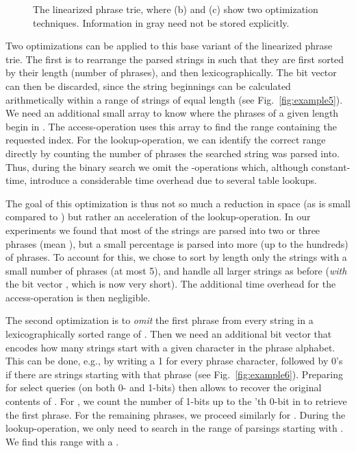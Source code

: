 \documentclass{llncs}
\begin{document}
\begin{figure}[t]
  \centering
  \hfill
  \hfill
  \caption{The linearized phrase trie, where (b) and (c) show two optimization techniques. Information in gray need not be stored explicitly.}
  \label{fig:final2}
\end{figure}

Two optimizations can be applied to this base variant of the linearized phrase trie. The first is to rearrange the parsed strings in  such that they are first sorted by their length (number of phrases), and then lexicographically. The bit vector  can then be discarded, since the string beginnings can be calculated arithmetically within a range of strings of equal length (see Fig.~\ref{fig:example5}). We need an additional small array  to know where the phrases of a given length begin in . The access-operation uses this array to find the range containing the requested index. For the lookup-operation, we can identify the correct range directly by counting the number of phrases the searched string was parsed into. Thus, during the binary search we omit the -operations which, although constant-time, introduce a considerable time overhead due to several table lookups.

The goal of this optimization is thus not so much a reduction in space (as  is small compared to ) but rather an acceleration of the lookup-operation. In our experiments we found that most of the strings are parsed into two or three phrases (mean ), but a small percentage is parsed into more (up to the hundreds) of phrases. To account for this, we chose to sort by length only the strings with a small number of phrases (at most 5), and handle all larger strings as before (\emph{with} the bit vector , which is now very short). The additional time overhead for the access-operation is then negligible.

The second optimization is to \emph{omit} the first phrase from every string in a lexicographically sorted range of . Then we need an additional bit vector  that encodes how many strings start with a given character in the phrase alphabet. This can be done, e.g., by writing a 1 for every phrase character, followed by  0's if there are  strings starting with that phrase (see Fig.~\ref{fig:example6}). Preparing  for select queries (on both 0- and 1-bits) then allows to recover the original contents of . For , we count the number of 1-bits up to the 'th 0-bit in  to retrieve the first phrase. For the remaining phrases, we proceed similarly for . During the lookup-operation, we only need to search in the range of parsings starting with . We find this range with a . 
\end{document}
